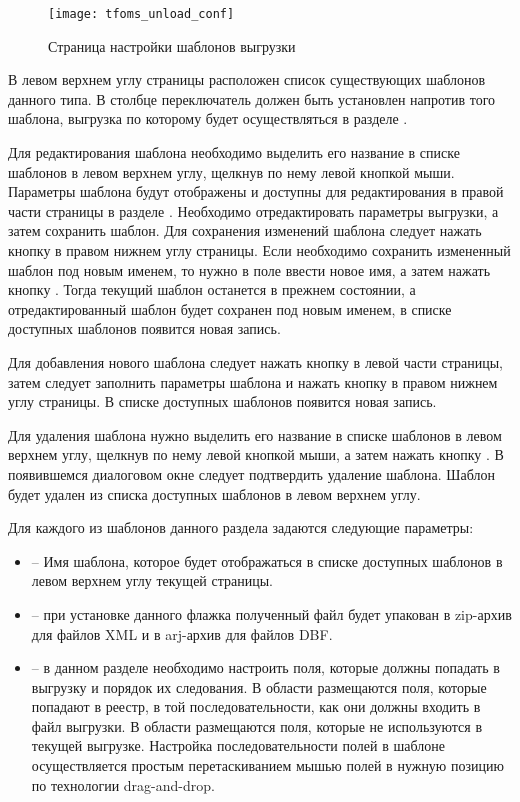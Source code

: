 \begin{figure}[ht]\centering
 \texttt{[image: tfoms\_unload\_conf]}
 \caption{Страница настройки шаблонов выгрузки}
 \label{img_tfoms_unload_conf}
\end{figure}

В левом верхнем углу страницы расположен список существующих шаблонов данного типа. В столбце  переключатель должен быть установлен напротив того шаблона, выгрузка по которому будет осуществляться в разделе .

Для редактирования шаблона необходимо выделить его название в списке шаблонов в левом верхнем углу, щелкнув по нему левой кнопкой мыши. Параметры шаблона будут отображены и доступны для редактирования в правой части страницы в разделе . Необходимо отредактировать параметры выгрузки, а затем сохранить шаблон. Для сохранения изменений шаблона следует нажать кнопку  в правом нижнем углу страницы. Если необходимо сохранить измененный шаблон под новым именем, то нужно в поле  ввести новое имя, а затем нажать кнопку  . Тогда текущий шаблон останется в прежнем состоянии, а отредактированный шаблон будет сохранен под новым именем, в списке доступных шаблонов появится новая запись.

Для добавления нового шаблона следует нажать кнопку    в левой части страницы, затем следует заполнить параметры шаблона и нажать кнопку  в правом нижнем углу страницы. В списке доступных шаблонов появится новая запись.

Для удаления шаблона нужно выделить его название в списке шаблонов в левом верхнем углу, щелкнув по нему левой кнопкой мыши, а затем нажать кнопку  . В появившемся диалоговом окне следует подтвердить удаление шаблона. Шаблон будет удален из списка доступных шаблонов в левом верхнем углу.

Для каждого из шаблонов данного раздела задаются следующие параметры:
\begin{itemize}
 \item {} – Имя шаблона, которое будет отображаться в списке доступных шаблонов в левом верхнем углу текущей страницы.
 \item {} – при установке данного флажка полученный файл будет упакован в zip-архив для файлов XML и в arj-архив для файлов DBF.
 \item {} – в данном разделе необходимо настроить поля, которые должны попадать в выгрузку и порядок их следования. В области  размещаются поля, которые попадают в реестр, в той последовательности, как они должны входить в файл выгрузки. В области  размещаются поля, которые не используются в текущей выгрузке. Настройка последовательности полей в шаблоне осуществляется простым перетаскиванием мышью полей в нужную позицию по технологии drag-and-drop.
\end{itemize}

